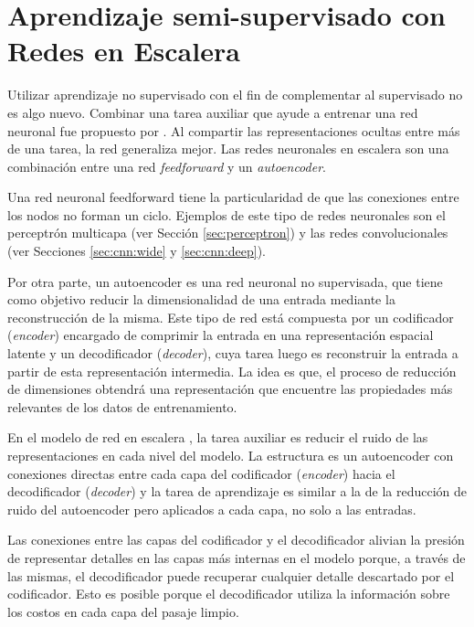 \section{Aprendizaje semi-supervisado con Redes en Escalera}
\label{sec:related_work_ladder}

Utilizar aprendizaje no supervisado con el fin de complementar al supervisado no es algo nuevo. Combinar una tarea auxiliar que ayude a entrenar una red neuronal fue propuesto por \cite{DBLP:conf/eurasip/SuddarthK90}. Al compartir las representaciones ocultas entre más de una tarea, la red generaliza mejor. Las redes neuronales en escalera son una combinación entre una red \textit{feedforward} y un \textit{autoencoder}. 

Una red neuronal feedforward tiene la particularidad de que las conexiones entre los nodos no forman un ciclo. Ejemplos de este tipo de redes neuronales son el perceptrón multicapa (ver Sección \ref{sec:perceptron}) y las redes convolucionales (ver Secciones \ref{sec:cnn:wide} y \ref{sec:cnn:deep}).

Por otra parte, un autoencoder es una red neuronal no supervisada, que tiene como objetivo reducir la dimensionalidad de una entrada mediante la reconstrucción de la misma. Este tipo de red está compuesta por un codificador (\textit{encoder}) encargado de comprimir la entrada en una representación espacial latente y un decodificador (\textit{decoder}), cuya tarea luego es reconstruir la entrada a partir de esta representación intermedia. La idea es que, el proceso de reducción de dimensiones obtendrá una representación que encuentre las propiedades más relevantes de los datos de entrenamiento.

En el modelo de red en escalera \cite{DBLP:journals/corr/Valpola14}, la tarea auxiliar es reducir el ruido de las representaciones en cada nivel del modelo. La estructura es un autoencoder con conexiones directas entre cada capa del codificador (\textit{encoder}) hacia el decodificador (\textit{decoder}) y la tarea de aprendizaje es similar a la de la reducción de ruido del autoencoder pero aplicados a cada capa, no solo a las entradas. 

Las conexiones entre las capas del codificador y el decodificador alivian la presión de representar detalles en las capas más internas en el modelo porque, a través de las mismas, el decodificador puede recuperar cualquier detalle descartado por el codificador. Esto es posible porque el decodificador utiliza la información sobre los costos en cada capa del pasaje limpio. 

